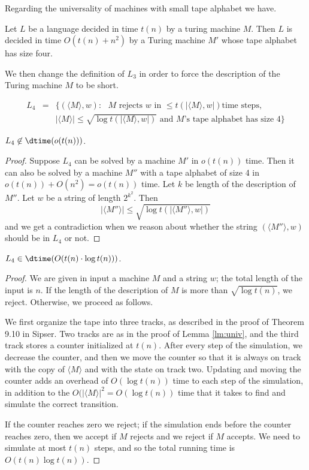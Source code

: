 \documentclass[11pt]{article}
\begin{document}
Regarding the universality of machines with small tape alphabet we have.

\begin{lemma}
Let $L$ be a language decided in time $t(n)$ by a turing machine $M$.
Then $L$ is decided in time $O(t(n) + n^2)$ by a Turing machine $M'$
whose tape alphabet has size four.
\end{lemma}


We then change the definition of $L_3$ in order to force the description of
the Turing machine $M$ to be short.

\begin{eqnarray*}
 L_4 & =   & \{( \langle M \rangle, w) : \mbox{ $M$ rejects $w$ in $\leq t(|\langle M \rangle, w|)$
time steps},\\ && |\langle M \rangle | \leq \sqrt{\log t(|\langle M \rangle, w|)} \mbox{ and $M$'s 
tape alphabet has size 4} \} \end{eqnarray*}

\begin{lemma}
$L_4 \not\in \dtime (o(t(n)))$.
\end{lemma}

\begin{proof}
Suppose $L_4$ can be solved by a machine $M'$ in $o(t(n))$ time.
Then it can also be solved by a machine $M''$ with a tape alphabet
of size 4 in $o(t(n)) + O(n^2) = o(t(n))$ time. Let $k$
be length of the description of $M''$. Let 
$w$ be a string of length $2^{k^2}$. Then 
\[ |\langle M'' \rangle | \leq \sqrt{\log t(|\langle M'' \rangle, w|)} \]
and we get a contradiction when we reason about whether the
string $(\langle M'' \rangle, w)$ should be in $L_4$ or not. 
\end{proof}

\begin{lemma} \label{lm:simtime}
$L_4 \in \dtime (O(t(n)\cdot \log t(n)))$.
\end{lemma}

\begin{proof}
We are given in input a machine $M$ and a string $w$; the total length of
the input is $n$. If the length of the description of $M$ is more than $\sqrt{\log t(n)}$,
we reject. Otherwise, we proceed as follows.

We first organize the tape into three tracks, as described in the proof of 
Theorem 9.10 in Sipser. Two tracks are as in the proof of Lemma \ref{lm:univ},
and the third track stores a counter initialized at $t(n)$. After every step of
the simulation, we decrease the counter, and then we move the counter so that
it is always on track with the copy of $\langle M \rangle$ and with the state
on track two. Updating and moving the counter adds an overhead of $O(\log t(n))$ time
to each step of the simulation, in addition to the $O(|\langle M \rangle |^2 = O(\log t(n))$
time that it takes to find and simulate the correct transition. 

If the counter reaches zero we reject; if the simulation ends before the
counter reaches zero, then we accept if $M$ rejects and we reject if $M$
accepts. We need to simulate at most $t(n)$ steps, and so 
the total running time is $O(t(n) \log t(n))$.
\end{proof}
\end{document}
